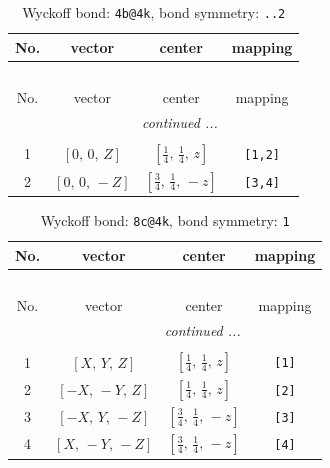 \documentclass[fleqn,8pt]{jsarticle}
\begin{document}
\renewcommand{\arraystretch}{1.2}
\begin{longtable}{cccc}
\caption{Wyckoff bond: {\tt 4b@4k}, bond symmetry: {\tt ..2}}
 \\
 \hline \hline
No. & vector & center & mapping \\ \hline \endfirsthead

\multicolumn{3}{l}{\tablename\ \thetable{}} \\
 \hline \hline
No. & vector & center & mapping \\ \hline \endhead

 \hline \hline
\multicolumn{3}{r}{\footnotesize\it continued ...} \\ \endfoot

 \hline \hline
\multicolumn{3}{r}{} \\ \endlastfoot

1 & $\left[ 0,\, 0,\, Z \right]$ & $\left[ \frac{1}{4},\, \frac{1}{4},\, z \right]$ & {\tt [1,2]} \\ \hline
2 & $\left[ 0,\, 0,\, - Z \right]$ & $\left[ \frac{3}{4},\, \frac{1}{4},\, - z \right]$ & {\tt [3,4]} \\
\end{longtable}
\renewcommand{\arraystretch}{1.2}
\begin{longtable}{cccc}
\caption{Wyckoff bond: {\tt 8c@4k}, bond symmetry: {\tt 1}}
 \\
 \hline \hline
No. & vector & center & mapping \\ \hline \endfirsthead

\multicolumn{3}{l}{\tablename\ \thetable{}} \\
 \hline \hline
No. & vector & center & mapping \\ \hline \endhead

 \hline \hline
\multicolumn{3}{r}{\footnotesize\it continued ...} \\ \endfoot

 \hline \hline
\multicolumn{3}{r}{} \\ \endlastfoot

1 & $\left[ X,\, Y,\, Z \right]$ & $\left[ \frac{1}{4},\, \frac{1}{4},\, z \right]$ & {\tt [1]} \\ \hline
2 & $\left[ - X,\, - Y,\, Z \right]$ & $\left[ \frac{1}{4},\, \frac{1}{4},\, z \right]$ & {\tt [2]} \\ \hline
3 & $\left[ - X,\, Y,\, - Z \right]$ & $\left[ \frac{3}{4},\, \frac{1}{4},\, - z \right]$ & {\tt [3]} \\ \hline
4 & $\left[ X,\, - Y,\, - Z \right]$ & $\left[ \frac{3}{4},\, \frac{1}{4},\, - z \right]$ & {\tt [4]} \\
\end{longtable}
\end{document}
